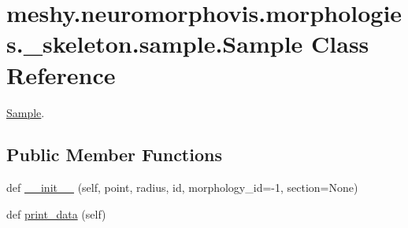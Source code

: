 \hypertarget{classmeshy_1_1neuromorphovis_1_1morphologies_1_1__skeleton_1_1sample_1_1Sample}{}\section{meshy.\+neuromorphovis.\+morphologies.\+\_\+skeleton.\+sample.\+Sample Class Reference}
\label{classmeshy_1_1neuromorphovis_1_1morphologies_1_1__skeleton_1_1sample_1_1Sample}


\hyperlink{classmeshy_1_1neuromorphovis_1_1morphologies_1_1__skeleton_1_1sample_1_1Sample}{Sample}.  


\subsection*{Public Member Functions}
\begin{DoxyCompactItemize}
\item 
def \hyperlink{classmeshy_1_1neuromorphovis_1_1morphologies_1_1__skeleton_1_1sample_1_1Sample_a1b8bd9837282e2bf5fda0ab22174f512}{\+\_\+\+\_\+init\+\_\+\+\_\+} (self, point, radius, id, morphology\+\_\+id=-\/1, section=None)
\item 
def \hyperlink{classmeshy_1_1neuromorphovis_1_1morphologies_1_1__skeleton_1_1sample_1_1Sample_a96ea29a92eb08dfb3333e00b8d6cc773}{print\+\_\+data} (self)
\end{DoxyCompactItemize}

